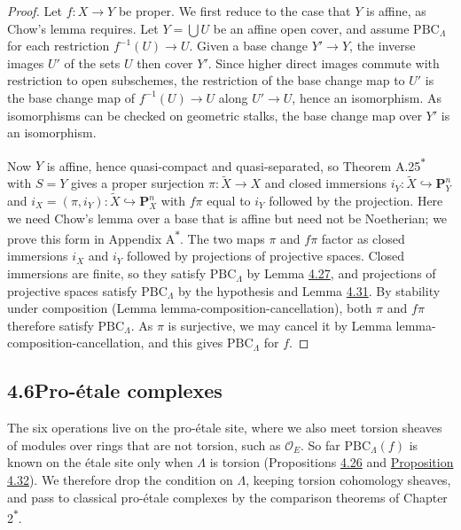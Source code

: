 \documentclass[11pt]{article}
\newcommand{\bpout}[1]{#1\textsuperscript{\hyperlink{bp-outside}{\ensuremath{\ast}}}}
\begin{document}
\begin{proof}[{Proof}]\label{bp95}%
Let \(f:X\to Y\) be proper. We first reduce to the case that \(Y\) is affine, as Chow's lemma requires. Let \(Y=\bigcup U\) be an affine open cover, and assume \(\mathrm{PBC}_\Lambda\) for each restriction \(f^{-1}(U)\to U\). Given a base change \(Y'\to Y\), the inverse images \(U'\) of the sets \(U\) then cover \(Y'\). Since higher direct images commute with restriction to open subschemes, the restriction of the base change map to \(U'\) is the base change map of \(f^{-1}(U)\to U\) along \(U'\to U\), hence an isomorphism. As isomorphisms can be checked on geometric stalks, the base change map over \(Y'\) is an isomorphism.

Now \(Y\) is affine, hence quasi-compact and quasi-separated, so Theorem \bpout{A.25} with \(S=Y\) gives a proper surjection \(\pi:\widetilde X\to X\) and closed immersions \(i_Y:\widetilde X\hookrightarrow\mathbf P^n_Y\) and \(i_X=(\pi,i_Y):\widetilde X\hookrightarrow\mathbf P^n_X\) with \(f\pi\) equal to \(i_Y\) followed by the projection. Here we need Chow's lemma over a base that is affine but need not be Noetherian; we prove this form in Appendix \bpout{A}. The two maps \(\pi\) and \(f\pi\) factor as closed immersions \(i_X\) and \(i_Y\) followed by projections of projective spaces. Closed immersions are finite, so they satisfy \(\mathrm{PBC}_\Lambda\) by Lemma \hyperref[bp80]{4.27}, and projections of projective spaces satisfy \(\mathrm{PBC}_\Lambda\) by the hypothesis and Lemma \hyperref[bp91]{4.31}. By stability under composition (Lemma lemma-composition-cancellation), both \(\pi\) and \(f\pi\) therefore satisfy \(\mathrm{PBC}_\Lambda\). As \(\pi\) is surjective, we may cancel it by Lemma lemma-composition-cancellation, and this gives \(\mathrm{PBC}_\Lambda\) for \(f\).
\end{proof}


\subsection*{\texorpdfstring{4.6\quad Pro-étale complexes}{4.6 Pro-étale complexes}}
\label{bp96}%
\label{bp97}%
The six operations live on the pro-étale site, where we also meet torsion sheaves of modules over rings that are not torsion, such as \(\mathcal O_E\). So far \(\mathrm{PBC}_\Lambda(f)\) is known on the étale site only when \(\Lambda\) is torsion (Propositions \hyperref[bp76]{4.26} and \hyperref[bp94]{Proposition 4.32}). We therefore drop the condition on \(\Lambda\), keeping torsion cohomology sheaves, and pass to classical pro-étale complexes by the comparison theorems of Chapter \bpout{2}.
\end{document}

